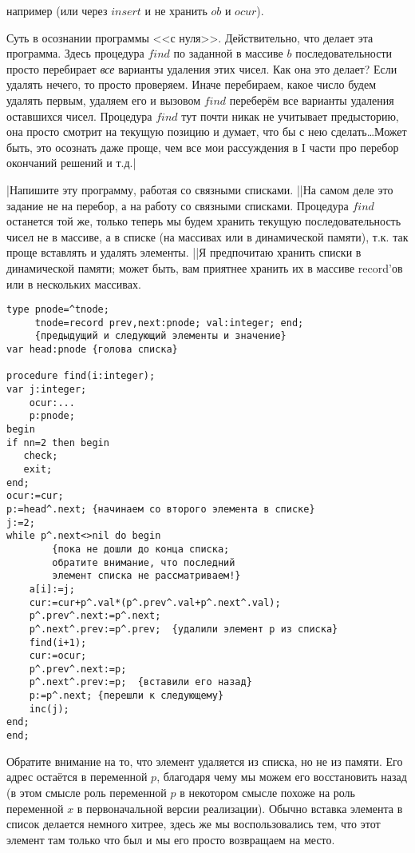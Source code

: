 например (или через $insert$ и не хранить $ob$ и $ocur$).

Суть в осознании программы <<с нуля>>. Действительно, что делает эта программа. 
Здесь процедура $find$ по заданной в массиве $b$ последовательности просто перебирает \textit{все} варианты удаления этих чисел.
Как она это делает? Если удалять нечего, то просто проверяем. Иначе перебираем, 
какое число будем удалять первым, удаляем его и вызовом $find$ переберём все 
варианты удаления оставшихся чисел. Процедура $find$ тут почти никак не учитывает предысторию, она просто смотрит на текущую позицию и думает, что бы с нею сделать\dots Может быть, это осознать даже проще, чем 
все мои рассуждения в I части про перебор окончаний решений и т.д.|

\task|Напишите эту программу, работая со связными списками.
||На самом деле это задание не на перебор, а на работу со связными списками. Процедура $find$ останется той же, только теперь мы будем хранить текущую последовательность чисел не в массиве, а в списке (на массивах или в динамической памяти), т.к. так проще вставлять и удалять элементы.
||Я предпочитаю хранить списки в динамической памяти; может быть, вам приятнее хранить их в массиве record'ов или в нескольких массивах. 

\begin{codesample}\begin{verbatim}
type pnode=^tnode;
     tnode=record prev,next:pnode; val:integer; end; 
     {предыдущий и следующий элементы и значение}
var head:pnode {голова списка}

procedure find(i:integer);
var j:integer;
    ocur:...
    p:pnode;
begin
if nn=2 then begin
   check;
   exit;
end;
ocur:=cur;
p:=head^.next; {начинаем со второго элемента в списке}
j:=2;
while p^.next<>nil do begin 
        {пока не дошли до конца списка; 
        обратите внимание, что последний 
        элемент списка не рассматриваем!}
    a[i]:=j;
    cur:=cur+p^.val*(p^.prev^.val+p^.next^.val);
    p^.prev^.next:=p^.next;
    p^.next^.prev:=p^.prev;  {удалили элемент p из списка}
    find(i+1);
    cur:=ocur;
    p^.prev^.next:=p;
    p^.next^.prev:=p;  {вставили его назад}
    p:=p^.next; {перешли к следующему}
    inc(j);
end;
end;
\end{verbatim}
\end{codesample}

Обратите внимание на то, что элемент удаляется из списка, но не из памяти. Его адрес остаётся в переменной $p$, благодаря чему мы можем его восстановить назад (в этом смысле роль переменной $p$ в некотором смысле похоже на роль переменной $x$ в первоначальной версии реализации). Обычно вставка элемента в список делается немного хитрее, здесь же мы воспользовались тем, что этот элемент там только что был и мы его просто возвращаем на место.

